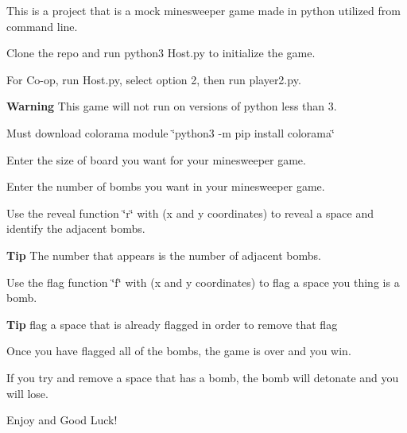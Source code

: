 This is a project that is a mock minesweeper game made in python utilized from command line.


\begin{DoxyEnumerate}
\item Clone the repo and run python3 Host.\+py to initialize the game.
\item For Co-\/op, run Host.\+py, select option 2, then run player2.\+py.
\end{DoxyEnumerate}

{\bfseries Warning} This game will not run on versions of python less than 3.

Must download colorama module \char`\"{}python3 -\/m pip install colorama\char`\"{}


\begin{DoxyEnumerate}
\item Enter the size of board you want for your minesweeper game.
\item Enter the number of bombs you want in your minesweeper game.
\item Use the reveal function \char`\"{}r\char`\"{} with (x and y coordinates) to reveal a space and identify the adjacent bombs.
\end{DoxyEnumerate}

{\bfseries Tip} The number that appears is the number of adjacent bombs.


\begin{DoxyEnumerate}
\item Use the flag function \char`\"{}f\char`\"{} with (x and y coordinates) to flag a space you thing is a bomb.
\end{DoxyEnumerate}

{\bfseries Tip} flag a space that is already flagged in order to remove that flag


\begin{DoxyEnumerate}
\item Once you have flagged all of the bombs, the game is over and you win.
\item If you try and remove a space that has a bomb, the bomb will detonate and you will lose.
\item Enjoy and Good Luck! 
\end{DoxyEnumerate}